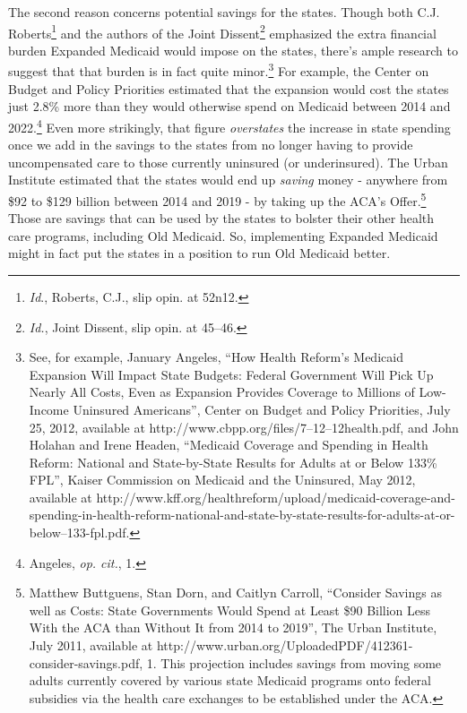 The second reason concerns potential savings for the states. Though both C.J. Roberts\footnote{\emph{Id}., Roberts, C.J., slip opin. at 52n12.} and the authors of the Joint Dissent\footnote{\emph{Id.}, Joint Dissent, slip opin. at 45--46.} emphasized the extra financial burden Expanded Medicaid would impose on the states, there's ample research to suggest that that burden is in fact quite minor.\footnote{See, for example, January Angeles, ``How Health Reform's Medicaid Expansion Will Impact State Budgets: Federal Government Will Pick Up Nearly All Costs, Even as Expansion
Provides Coverage to Millions of Low-Income Uninsured Americans'', Center on Budget and Policy Priorities, July 25, 2012, available at http:/\slash www.cbpp.org\slash files\slash 7--12--12health.pdf, and John Holahan and Irene Headen, ``Medicaid Coverage and Spending in Health Reform: National and State-by-State Results for Adults at or Below 133\% FPL'', Kaiser Commission on Medicaid and the Uninsured, May 2012, available at http:/\slash www.kff.org\slash healthreform\slash upload\slash medicaid-coverage-and-spending-in-health-reform-national-and-state-by-state-results-for-adults-at-or-below--133-fpl.pdf.} For example, the Center on Budget and Policy Priorities estimated that the expansion would cost the states just 2.8\% more than they would otherwise spend on Medicaid between 2014 and 2022.\footnote{Angeles, \emph{op. cit.}, 1.} Even more strikingly, that figure \emph{overstates} the increase in state spending once we add in the savings to the states from no longer having to provide uncompensated care to those currently uninsured (or underinsured). The Urban Institute estimated that the states would end up \emph{saving }money - anywhere from \$92 to \$129 billion between 2014 and 2019 - by taking up the ACA's Offer.\footnote{Matthew Buttguens, Stan Dorn, and Caitlyn Carroll, ``Consider Savings as well as Costs: State Governments Would Spend at Least \$90 Billion Less With the ACA than Without It from 2014 to 2019'', The Urban Institute, July 2011, available at http:/\slash www.urban.org\slash UploadedPDF\slash 412361-consider-savings.pdf, 1. This projection includes savings from moving some adults currently covered by various state Medicaid programs onto federal subsidies via the health care exchanges to be established under the ACA.} Those are savings that can be used by the states to bolster their other health care programs, including Old Medicaid. So, implementing Expanded Medicaid might in fact put the states in a position to run Old Medicaid better. 

